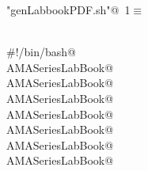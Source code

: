\documentclass[hyperref,idxtotoc]{labbook}
\begin{document}
\begin{flushleft} \small
\begin{minipage}{\linewidth}\label{scrap1}\raggedright\small
{} \verb@"genLabbookPDF.sh"@\nobreak\ {\footnotesize {1}}$\equiv$
\vspace{-1ex}
\begin{list}{}{} \item
\mbox{}\verb@@\\
\mbox{}\verb@#!/bin/bash@\\
\mbox{}\verb@nuweb  AMASeriesLabBook@\\
\mbox{}\verb@pdflatex  AMASeriesLabBook@\\
\mbox{}\verb@makeindex  AMASeriesLabBook@\\
\mbox{}\verb@bibtex  AMASeriesLabBook@\\
\mbox{}\verb@nuweb  AMASeriesLabBook@\\
\mbox{}\verb@pdflatex  AMASeriesLabBook@\\
\mbox{}\verb@pdflatex  AMASeriesLabBook@\\
\mbox{}\verb@@{\NWsep}
\end{list}
\vspace{-1.5ex}
\footnotesize
\begin{list}{}{\setlength{\itemsep}{-\parsep}\setlength{\itemindent}{-\leftmargin}}

\item{}
\end{list}
\end{minipage}\vspace{4ex}
\end{flushleft}
\end{document}
